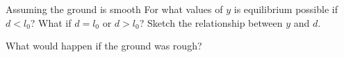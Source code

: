 {\begin{enumerate}
            Assuming the ground is smooth For what values of $y$ is
            equilibrium possible if $d < l_0$? What if $d = l_0$ or $d > l_0$?
            Sketch the relationship between $y$ and $d$.

            What would happen if the ground was rough?
    \end{enumerate}
}
